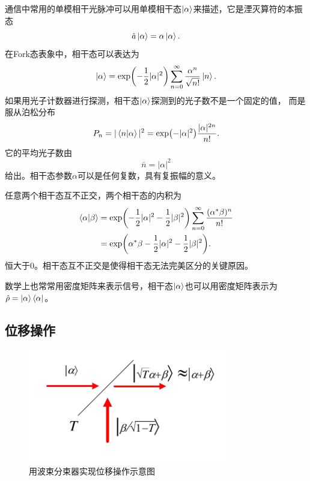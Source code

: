 通信中常用的单模相干光脉冲可以用单模相干态$\ket{\alpha}$来描述，它是湮灭算符的本振态
\begin{equation}
\hat{a} \ket{\alpha} = \alpha \ket{\alpha}.
\end{equation}
在Fork态表象中，相干态可以表达为
\begin{equation}
\ket{\alpha} = \exp(-\frac{1}{2}|\alpha|^2) \sum_{n=0}^\infty \frac{\alpha^n}{\sqrt{n!}} \ket{n}.
\end{equation}
如果用光子计数器进行探测，相干态$\ket{\alpha}$探测到的光子数不是一个固定的值，
而是服从泊松分布
\begin{equation}
P_n = |\bra{n}\ket{\alpha}|^2 = \exp(-|\alpha|^2) \frac{|\alpha|^{2n}}{n!} .
\end{equation}
它的平均光子数由
\begin{equation}
\bar{n} = |\alpha|^2
\end{equation}
给出。相干态参数${\alpha}$可以是任何复数，具有复振幅的意义\cite{glauber1963coherent}。

任意两个相干态互不正交，两个相干态的内积为
\begin{equation}
\begin{split}
\bra{\alpha}\ket{\beta} &= \exp(-\frac{1}{2}|\alpha|^2 - \frac{1}{2} |\beta|^2) \sum_{n=0}^\infty \frac{(\alpha^*\beta)^n}{n!} \\
                         &= \exp(\alpha^*\beta -\frac{1}{2}|\alpha|^2 - \frac{1}{2} |\beta|^2).
\end{split}
\end{equation}
恒大于0。相干态互不正交是使得相干态无法完美区分的关键原因。

数学上也常常用密度矩阵来表示信号\cite{wt2001qm}，相干态$\ket{\alpha}$也可以用密度矩阵表示为
$\hat{\rho} = \ket{\alpha}\bra{\alpha}$。



\subsection{位移操作}

\begin{figure}
\centering
  \includegraphics[height=5cm]{figures/chap2/displacement-operator}
  \caption{用波束分束器实现位移操作示意图}
  \label{fig:diaplacement}
\end{figure}

